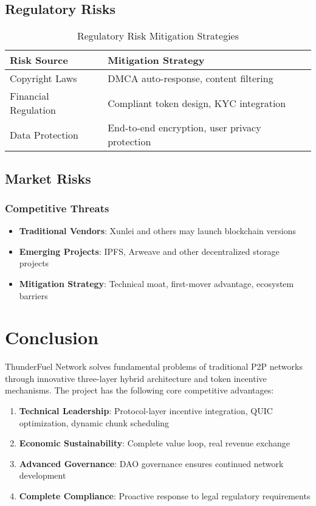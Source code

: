 \documentclass[12pt,a4paper]{article}
\begin{document}
\subsection{Regulatory Risks}

\begin{table}[htbp]
\centering
\begin{tabular}{|l|l|}
\hline
\textbf{Risk Source} & \textbf{Mitigation Strategy} \\
\hline
Copyright Laws & DMCA auto-response, content filtering \\
\hline
Financial Regulation & Compliant token design, KYC integration \\
\hline
Data Protection & End-to-end encryption, user privacy protection \\
\hline
\end{tabular}
\caption{Regulatory Risk Mitigation Strategies}
\end{table}

\subsection{Market Risks}

\subsubsection{Competitive Threats}
\begin{itemize}
    \item \textbf{Traditional Vendors}: Xunlei and others may launch blockchain versions
    \item \textbf{Emerging Projects}: IPFS, Arweave and other decentralized storage projects
    \item \textbf{Mitigation Strategy}: Technical moat, first-mover advantage, ecosystem barriers
\end{itemize}

\section{Conclusion}

ThunderFuel Network solves fundamental problems of traditional P2P networks through innovative three-layer hybrid architecture and token incentive mechanisms. The project has the following core competitive advantages:

\begin{enumerate}
    \item \textbf{Technical Leadership}: Protocol-layer incentive integration, QUIC optimization, dynamic chunk scheduling
    \item \textbf{Economic Sustainability}: Complete value loop, real revenue exchange
    \item \textbf{Advanced Governance}: DAO governance ensures continued network development
    \item \textbf{Complete Compliance}: Proactive response to legal regulatory requirements
\end{enumerate}
\end{document}
